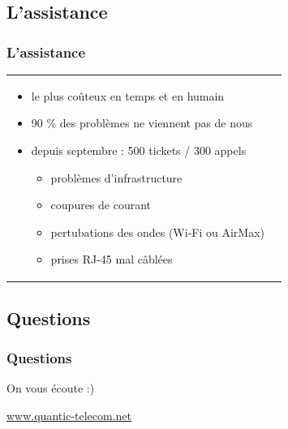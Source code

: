 \documentclass[handout]{beamer}
\begin{document}
	\subsection{L'assistance}
		\begin{frame}
		\frametitle{L'assistance}
		\begin{tabular}{l l}
			\begin{minipage}{0.2\textwidth}
				\begin{center}
				\end{center}
			\end{minipage}

			\begin{minipage}{0.8\textwidth}
				\begin{itemize}
					\item le plus coûteux en temps et en humain
					\item 90 \% des problèmes ne viennent pas de nous
					\item depuis septembre : 500 tickets / 300 appels
					\begin{itemize}
						\item problèmes d'infrastructure
						\item coupures de courant
						\item pertubations des ondes (Wi-Fi ou AirMax)
						\item prises RJ-45 mal câblées
					\end{itemize}
				\end{itemize}
			\end{minipage}
			
		\end{tabular}
		\end{frame}

	\subsection{Questions}
		\begin{frame}
		\frametitle{Questions}
		\huge{On vous écoute :)}
		\vspace{40px}
		\begin{center}
		\end{center}
		\begin{center}
			\small{\underline{www.quantic-telecom.net}}
		\end{center}
		\end{frame}


\end{document}
